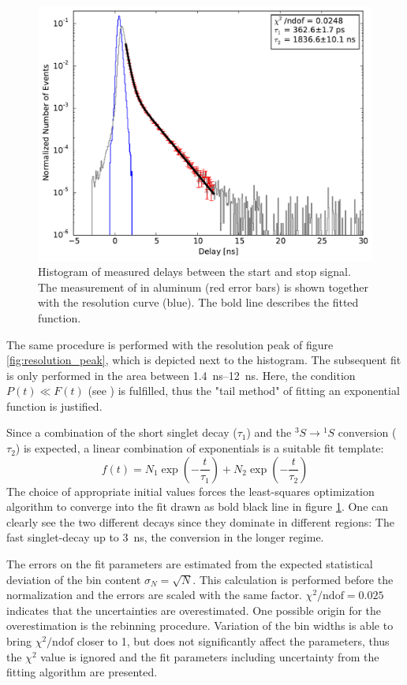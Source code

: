 \documentclass[
	paper=A4,
	parskip=full,
	chapterprefix=true,
	11pt,
	headings=normal,
	bibliography=totoc,
	listof=totoc,
	titlepage=on,
]{scrreprt}
\begin{document}
\begin{figure}
	\centering
	\includegraphics{na22_polyethylen}
	\caption{Histogram of measured delays between the start and stop signal. The measurement of  in aluminum (red error bars) is shown together with the resolution curve (blue). The bold line describes the fitted function.}
	\label{fig:Na22_poly}
\end{figure}

The same procedure is performed with the resolution peak of figure \ref{fig:resolution_peak}, which is depicted next to the histogram. The subsequent fit is only performed in the area between \SIrange{1.4}{12}{\nano\second}. Here, the condition $P(t) \ll F(t)$ (see \cite{Lab_manual_T8}) is fulfilled, thus the "tail method" of fitting an exponential function is justified.

Since a combination of the short singlet decay ($\tau_1$) and the ${^3S} \rightarrow {^1S}$ conversion ($\tau_2$) is expected, a linear combination of exponentials is a suitable fit template:
\begin{equation}
	f(t) = N_1 \exp(-\frac{t}{\tau_1}) + N_2 \exp(-\frac{t}{\tau_2})
\end{equation}
The choice of appropriate initial values forces the least-squares optimization algorithm to converge into the fit drawn as bold black line in figure \ref{fig:Na22_poly}. One can clearly see the two different decays since they dominate in different regions: The fast singlet-decay up to \SI{3}{\nano\second}, the conversion in the longer regime.

The errors on the fit parameters are estimated from the expected statistical deviation of the bin content $\sigma_N = \sqrt{N}$. This calculation is performed before the normalization and the errors are scaled with the same factor. $\chi^2/\mathrm{ndof} = \num{0.025}$ indicates that the uncertainties are overestimated. One possible origin for the overestimation is the rebinning procedure. Variation of the bin widths is able to bring $\chi^2/\mathrm{ndof}$ closer to \num{1}, but does not significantly affect the parameters, thus the $\chi^2$ value is ignored and the fit parameters including uncertainty from the fitting algorithm are presented.
\end{document}
